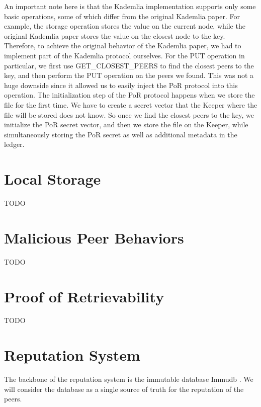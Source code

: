An important note here is that the Kademlia implementation supports only some basic operations,
some of which differ from the original Kademlia paper.
For example, the storage operation stores the value on the current node,
while the original Kademlia paper stores the value on the closest node to the key.
Therefore, to achieve the original behavior of the Kademlia paper,
we had to implement part of the Kademlia protocol ourselves.
For the PUT operation in particular, we first use GET_CLOSEST_PEERS to find the closest peers to the key,
and then perform the PUT operation on the peers we found.
This was not a huge downside since it allowed us to easily inject the PoR protocol into this operation.
The initialization step of the PoR protocol happens when we store the file for the first time.
We have to create a secret vector that the Keeper where the file will be stored does not know.
So once we find the closest peers to the key, we initialize the PoR secret vector,
and then we store the file on the Keeper,
while simultaneously storing the PoR secret as well as additional metadata in the ledger.

\section{Local Storage}

TODO

\section{Malicious Peer Behaviors}

TODO

\section{Proof of Retrievability}

TODO


\section{Reputation System}
\label{section:reputation-system}

The backbone of the reputation system is the immutable database Immudb \cite{immudb}.
We will consider the database as a single source of truth for the reputation of the peers.

